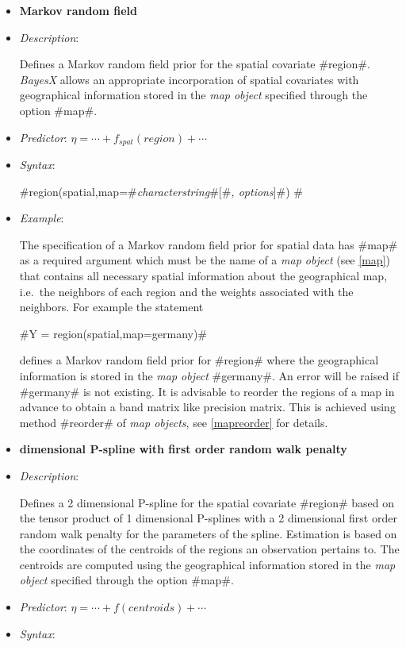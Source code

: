 \begin{itemize}
\item[]{\bf\sffamily Markov random field}

\item[] {\em Description}:

Defines a Markov random field prior for the spatial covariate
#region#. {\em BayesX} allows an appropriate incorporation of
spatial covariates with geographical information stored in the {\em
map object} specified through the option #map#.
\item[] {\em Predictor}: $\eta = \cdots + f_{spat}(region) + \cdots$
\item[] {\em Syntax}:

#region(spatial,map=#{\em characterstring}#[#{\em , options}]#) #
\item[] {\em Example}:

The specification of a Markov random field prior for spatial data
has #map# as a required argument which must be the name of a {\em
map object} (see \autoref{map}) that contains all necessary
spatial information about the geographical map, i.e.~the neighbors
of each region and the weights associated with the neighbors. For
example the statement

#Y = region(spatial,map=germany)#

defines a Markov random field prior for #region# where the
geographical information is stored in the {\em map object}
#germany#. An error will be raised if #germany# is not existing.
It is advisable to reorder the regions of a map in advance to
obtain a band matrix like precision matrix. This is achieved using
method #reorder# of {\em map objects}, see \autoref{mapreorder}
for details.

\item[]{\bf{} dimensional P-spline with first order
random walk penalty}

\item[] {\em Description}:

Defines a 2 dimensional P-spline for the spatial covariate
#region# based on the tensor product of 1 dimensional P-splines
with a 2 dimensional first order random walk penalty for the
parameters of the spline. Estimation is based on the coordinates
of the centroids of the regions an observation pertains to. The
centroids are computed using the geographical information stored
in the {\em map object} specified through the option #map#.
\item[] {\em Predictor}: $\eta= \cdots + f(centroids) + \cdots$
\item[] {\em Syntax}:


\end{itemize}
